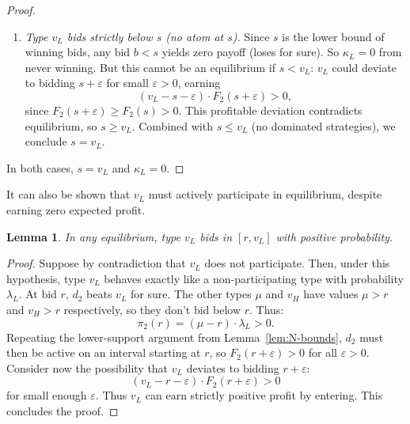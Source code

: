 \documentclass[11pt]{article}
\theoremstyle{plain}
\theoremstyle{definition}
\theoremstyle{plain}
\theoremstyle{plain}
\theoremstyle{plain}
\newtheorem{lem}[thm]{Lemma}
\theoremstyle{plain}
\numberwithin{equation}{section}
\begin{document}
\begin{proof}
\begin{enumerate}
\item \textit{Type $v_L$ bids strictly below $s$ (no atom at $s$).} Since $s$ is the lower bound of winning bids, any bid $b < s$ yields zero payoff (loses for sure). So $\kappa_L = 0$ from never winning. But this cannot be an equilibrium if $s < v_L$: $v_L$ could deviate to bidding $s + \varepsilon$ for small $\varepsilon > 0$, earning
\[
(v_L - s - \varepsilon) \cdot F_2(s + \varepsilon) > 0,
\]
since $F_2(s + \varepsilon) \geq F_2(s) > 0$. This profitable deviation contradicts equilibrium, so $s \geq v_L$. Combined with $s \leq v_L$ (no dominated strategies), we conclude $s = v_L$.
\end{enumerate}

\noindent In both cases, $s = v_L$ and $\kappa_L = 0$.
\end{proof}
\vspace{4mm}

\noindent It can also be shown that $v_L$ must actively participate in equilibrium, despite earning zero expected profit.

\begin{lem}\label{lem:nonbinding-participation}
In any equilibrium, type $v_L$ bids in $[r, v_L]$ with positive probability.
\end{lem}

\begin{proof}
Suppose by contradiction that $v_L$ does not participate. Then, under this hypothesis, type $v_L$ behaves exactly like a non-participating type with probability $\lambda_L$. At bid $r$, $d_2$ beats $v_L$ for sure. The other types $\mu$ and $v_H$ have values $\mu > r$ and $v_H > r$ respectively, so they don't bid below $r$. Thus:
\[
\pi_2(r) = (\mu - r) \cdot \lambda_L > 0.
\]
Repeating the lower-support argument from Lemma~\ref{lem:N-bounds}, $d_2$ must then be active on an interval starting at $r$, so $F_2(r + \varepsilon) > 0$ for all $\varepsilon > 0$. Consider now the possibility that $v_L$ deviates to bidding $r + \varepsilon$:
\[
(v_L - r - \varepsilon) \cdot F_2(r + \varepsilon) > 0
\]
for small enough $\varepsilon$. Thus $v_L$ can earn strictly positive profit by entering. This concludes the proof.
\end{proof}
\end{document}
